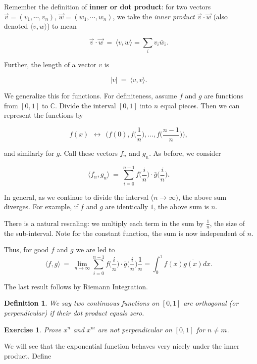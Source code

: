\documentclass[12pt,letterpaper]{report}
\newcommand\be{\begin{equation}}
\newcommand\ee{\end{equation}}
\newcommand{\tbf}[1]{\textbf{#1}}
\newcommand{\C}{\ensuremath{\mathbb{C}}}
\newtheorem{defi}[thm]{Definition}
\newtheorem{exe}[thm]{Exercise}
\begin{document}
Remember the definition of \tbf{inner or dot product}: for two
vectors $\vec{v} = (v_1,\dotsb,v_n)$, $\vec{w} =
(w_1,\dotsb,w_n)$, we take the {\em inner product} $\vec{v}\cdot
\vec{w}$ (also denoted $\langle v,w\rangle$) to mean

\be \vec{v}\cdot \vec{w} \ = \ \langle v,w\rangle = \sum_i v_i
\bar{w}_i .\ee

Further, the length of a vector $v$ is

\be |v| \ = \ \langle v, v \rangle. \ee

We generalize this for functions. For definiteness, assume $f$ and
$g$ are functions from $[0,1]$ to $\C$. Divide the interval
$[0,1]$ into $n$ equal pieces. Then we can represent the functions
by

\be f(x) \ \ \longleftrightarrow \ \ \Bigg(f(0),
f\Big(\frac{1}{n}\Big), \dots, f\Big(\frac{n-1}{n}\Big) \Bigg),
\ee

and similarly for $g$. Call these vectors $f_n$ and $g_n$. As
before, we consider

\be \langle f_n,g_n\rangle \ = \ \sum_{i=0}^{n-1}
f\Big(\frac{i}{n}\Big) \cdot \bar{g}\Big(\frac{i}{n}\Big). \ee

In general, as we continue to divide the interval ($n \rightarrow
\infty)$, the above sum diverges. For example, if $f$ and $g$ are
identically $1$, the above sum is $n$.

There is a natural rescaling: we multiply each term in the sum by
$\frac{1}{n}$, the size of the sub-interval. Note for the constant
function, the sum is now independent of $n$.

Thus, for good $f$ and $g$ we are led to \be \langle f,g\rangle \
= \ \lim_{n \rightarrow \infty} \sum_{i=0}^{n-1}
f\Big(\frac{i}{n}\Big) \cdot \bar{g}\Big(\frac{i}{n}\Big)
\frac{1}{n} = \int_0^1 f(x) \overline{g(x)}dx. \ee

The last result follows by Riemann Integration.

\begin{defi} We say two continuous functions on $[0,1]$ are
orthogonal (or perpendicular) if their dot product equals zero.
\end{defi}

\begin{exe} Prove $x^n$ and $x^m$ are not perpendicular on $[0,1]$
for $n \neq m$. \end{exe}

We will see that the exponential function behaves very nicely
under the inner product. Define
\end{document}
